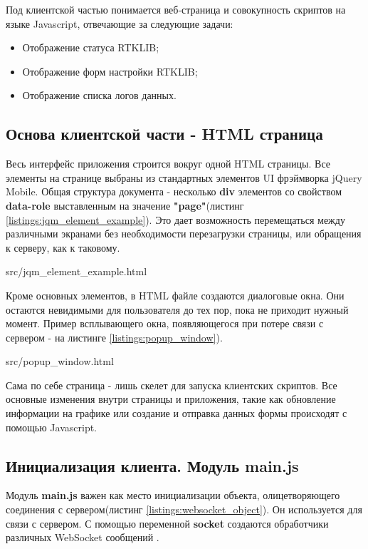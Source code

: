 Под клиентской частью понимается веб-страница и совокупность скриптов на языке Javascript, отвечающие за следующие задачи:

\begin{itemize}
  \item Отображение статуса RTKLIB;
  \item Отображение форм настройки RTKLIB;
  \item Отображение списка логов данных.
\end{itemize}

\subsection{Основа клиентской части - HTML страница} \label{subsect3_2_1}

Весь интерфейс приложения строится вокруг одной HTML страницы. Все элементы на странице выбраны из стандартных элементов UI фрэймворка jQuery Mobile. Общая структура документа - несколько \textbf{div} элементов со свойством \textbf{data-role} выставленным на значение \textbf{"page"}(листинг \ref{listings:jqm_element_example}). Это дает возможность перемещаться между различными экранами без необходимости перезагрузки страницы, или обращения к серверу, как к таковому.


{src/jqm_element_example.html}

Кроме основных элементов, в HTML файле создаются диалоговые окна. Они остаются невидимыми для пользователя до тех пор, пока не приходит нужный момент. Пример всплывающего окна, появляющегося при потере связи с сервером - на листинге \ref{listings:popup_window}).


{src/popup_window.html}

Сама по себе страница - лишь скелет для запуска клиентских скриптов. Все основные изменения внутри страницы и приложения, такие как обновление информации на графике или создание и отправка данных формы происходят с помощью Javascript.

\subsection{Инициализация клиента. Модуль main.js} \label{subsect3_2_2}

Модуль \textbf{main.js} важен как место инициализации объекта, олицетворяющего соединения с сервером(листинг \ref{listings:websocket_object}). Он используется для связи с сервером. С помощью переменной \textbf{socket} создаются обработчики различных WebSocket сообщений \cite{socketio-docs}.

